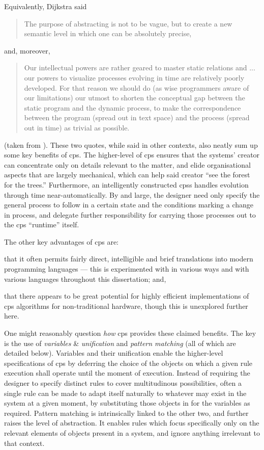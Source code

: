Equivalently, Dijkstra said \blockquote{The purpose of abstracting is not to be vague, but to create a new semantic level in which one can be absolutely precise,} and, moreover, \blockquote{Our intellectual powers are rather geared to master static relations and ... our powers to visualize processes evolving in time are relatively poorly developed. For that reason we should do (as wise programmers aware of our limitations) our utmost to shorten the conceptual gap between the static program and the dynamic process, to make the correspondence between the program (spread out in text space) and the process (spread out in time) as trivial as possible.} (taken from \cite{DijkstraWikiquote}).  These two quotes, while said in other contexts, also neatly sum up some key benefits of \gls{cps}.  The higher-level of \gls{cps} ensures that the systems' creator can concentrate only on details relevant to the matter, and elide organisational aspects that are largely mechanical, which can help said creator \enquote{see the forest for the trees.}  Furthermore, an intelligently constructed \glspl{cps} handles evolution through time near-automatically.  By and large, the designer need only specify the general process to follow in a certain state and the conditions marking a change in process, and delegate further responsibility for carrying those processes out to the \gls{cps} ``runtime'' itself.

The other key advantages of \gls{cps} are:
\begin{inparaenum}[a)]
\item that it often permits fairly direct, intelligible and brief translations into modern programming languages --- this is experimented with in various ways and with various languages throughout this dissertation; and,
\item that there appears to be great potential for highly efficient implementations of \gls{cps} algorithms for non-traditional hardware, though this is unexplored further here.
\end{inparaenum}

One might reasonably question \emph{how} \gls{cps} provides these claimed benefits.  The key is the use of \emph{variables} \& \emph{unification} and \emph{pattern matching} (all of which are detailed below).  Variables and their unification enable the higher-level specifications of \gls{cps} by deferring the choice of the objects on which a given rule execution shall operate until the moment of execution.  Instead of requiring the designer to specify distinct rules to cover multitudinous possibilities, often a single rule can be made to adapt itself naturally to whatever may exist in the system at a given moment, by substituting those objects in for the variables as required.  Pattern matching is intrinsically linked to the other two, and further raises the level of abstraction.  It enables rules which focus specifically only on the relevant elements of objects present in a system, and ignore anything irrelevant to that context.

